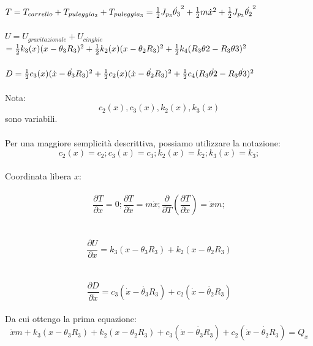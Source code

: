 \documentclass{article}
\begin{document}
$T = T_{carrello} + T_{puleggia_2}+ T_{puleggia_3}
= {1 \over 2}J_{p_3}\dot{\theta_{3}}^{2}+ {1 \over 2}m\dot{x}^{2} + {1 \over 2}J_{p_3}\dot{\theta_{2}}^{2}$
\\
\\
$U = U_{gravitazionale} + U_{cinghie} $
\\
$ ={1\over 2}k_{3}(x)(x-\theta_{3}R_{3})^{2}+\frac{1}{2}k_{2}(x)(x-\theta_{2}R_{3})^{2}+{1 \over 2}k_{4}(R_{3}\theta{2}-R_{3}\theta{3})^{2}$
\\
\\
$D ={1\over 2}c_{3}(x)(\dot{x}-\dot{\theta_{3}}R_{3})^{2}+\frac{1}{2}c_{2}(x)(\dot{x}-\dot{\theta_{2}}R_{3})^{2}+{1\over2} c_{4}(R_{3}\dot{\theta{2}}-R_{3}\dot{\theta{3}})^{2}$
\\
\\
Nota: 
$$c_{2}(x), c_{3}(x),k_{2}(x), k_{3}(x)$$ sono variabili.
\\
\\
Per una maggiore semplicità descrittiva, possiamo utilizzare la notazione:
\begin{equation*}
c_{2}(x) = c_{2};
c_{3}(x) = c_{3};
k_{2}(x) = k_{2};
k_{3}(x) = k_{3};
\end{equation*}
\\
Coordinata libera $x$:
\\
\\
\begin{equation*}
\frac{ \partial T}{\partial x} = 0 ; \frac{\partial T}{\partial \dot{x}} = m\dot{x};  \frac{\partial}{\partial T}(\frac{\partial T}{\partial \dot{x}})  = \ddot{x}m;
\end{equation*}
\\
\\
\begin{equation*}
\frac{\partial U}{\partial x} = k_3(x-\theta_3R_3) + k_2(x -\theta_2R_3)
\end{equation*}
\\
\\
\begin{equation*}
\frac{\partial D}{\partial \dot{x}} = c_3(\dot{x}-\dot{\theta_3}R_3) + c_2(\dot{x} -\dot{\theta_2}R_3)
\end{equation*}
\\
Da cui ottengo la prima equazione: 
\\
\begin{equation*}
 \ddot{x}m + k_{3}(x-\theta_{3}R_{3}) + k_{2}(x- \theta_{2}R_{3})+ c_{3}(\dot{x}-\dot{\theta_3}R_{3}) + c_{2}(\dot{x} - \dot{\theta_{2}}R_{3}) = Q_x
\end{equation*}
\end{document}
